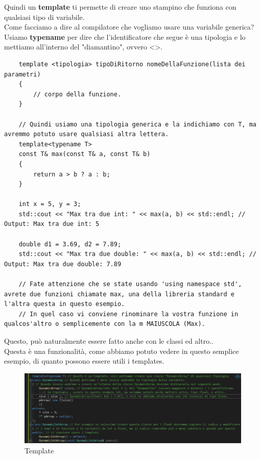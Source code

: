 \textsf{\small Quindi un \textbf{template} ti permette di creare uno stampino che funziona con qualsiasi tipo di variabile.} \\

\textsf{\small Come facciamo a dire al compilatore che vogliamo usare una variabile generica? Usiamo \textbf{typename} per dire che l'identificatore che segue è una tipologia e lo mettiamo all'interno del "diamantino", ovvero <>.} \\

\textsf{\small }

\begin{lstlisting}
	template <tipologia> tipoDiRitorno nomeDellaFunzione(lista dei parametri)
	{
		// corpo della funzione.
	}

	// Quindi usiamo una tipologia generica e la indichiamo con T, ma avremmo potuto usare qualsiasi altra lettera.
	template<typename T>
	const T& max(const T& a, const T& b)
	{
		return a > b ? a : b;
	}

	int x = 5, y = 3;
	std::cout << "Max tra due int: " << max(a, b) << std::endl; // Output: Max tra due int: 5
	
	double d1 = 3.69, d2 = 7.89;
	std::cout << "Max tra due double: " << max(a, b) << std::endl; // Output: Max tra due double: 7.89
	
	// Fate attenzione che se state usando 'using namespace std', avrete due funzioni chiamate max, una della libreria standard e l'altra questa in questo esempio.
	// In quel caso vi conviene rinominare la vostra funzione in qualcos'altro o semplicemente con la m MAIUSCOLA (Max).
\end{lstlisting}

\textsf{\small Questo, può naturalmente essere fatto anche con le classi ed altro..} \\

\textsf{\small Questa è una funzionalità, come abbiamo potuto vedere in questo semplice esempio, di quanto possono essere utili i templates.} \\

\begin{figure}[ht]
	\centering
	\includegraphics[width=1.2\textwidth, height=1.2\textheight, keepaspectratio]{./imgs/template.png}
	\caption{Template}
	\label{fig:template}
\end{figure}

